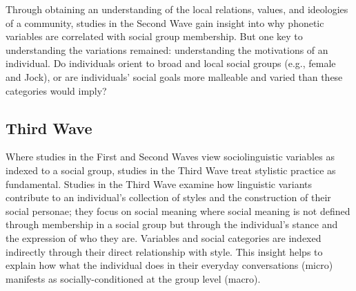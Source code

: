 
Through obtaining an understanding of the local relations, values, and ideologies of a community, studies in the Second Wave gain insight into why phonetic variables are correlated with social group membership. But one key to understanding the variations remained: understanding the motivations of an individual. Do individuals orient to broad and local social groups (e.g., female and Jock), or are individuals' social goals more malleable and varied than these categories would imply? 


\subsection{Third Wave}\label{sec:thirdwave}

Where studies in the First and Second Waves view sociolinguistic variables as indexed to a social group, studies in the Third Wave treat stylistic practice as fundamental. Studies in the Third Wave examine how linguistic variants contribute to an individual's collection of styles and the construction of their social personae; they focus on social meaning where social meaning is not defined through membership in a social group but through the individual's stance and the expression of who they are. Variables and social categories are indexed indirectly through their direct relationship with style. This insight helps to explain how what the individual does in their everyday conversations (micro) manifests as socially-conditioned at the group level (macro).

